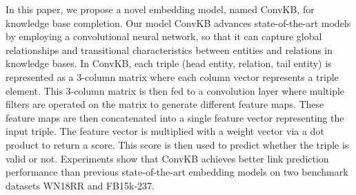In this paper, we propose a novel embedding model, named ConvKB, for  knowledge base completion. Our  model ConvKB advances  state-of-the-art models by employing a convolutional neural network, so that it can capture global relationships and transitional characteristics between entities and relations in  knowledge bases. In ConvKB, each  triple (head entity, relation, tail entity) is represented as a 3-column matrix where each column vector represents a triple element. This  3-column matrix is then fed to a convolution layer where multiple filters are operated on the matrix to generate different feature maps. These feature maps are then concatenated into a single feature vector representing the input triple. The feature vector is multiplied with a weight vector via a dot product to return a score. This score is then used to predict whether the triple is valid or not. Experiments show that ConvKB achieves better link prediction performance than previous state-of-the-art embedding models on two benchmark datasets WN18RR and FB15k-237.

